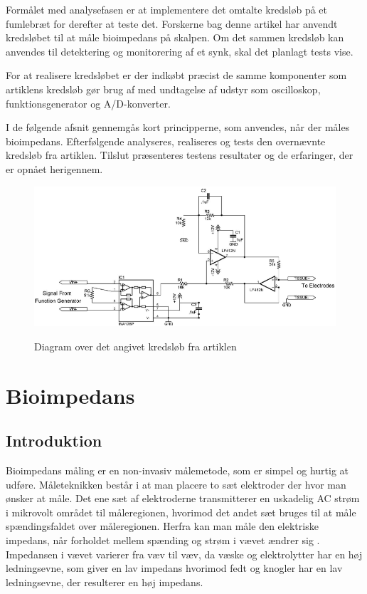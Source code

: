 Formålet med analysefasen er at implementere det omtalte kredsløb på et fumlebræt for derefter at teste det. Forskerne bag denne artikel har anvendt kredsløbet til at måle bioimpedans på skalpen. Om det sammen kredsløb kan anvendes til detektering og monitorering af et synk, skal det planlagt tests vise. 

For at realisere kredsløbet er der indkøbt præcist de samme komponenter  som artiklens kredsløb gør brug af med undtagelse af udstyr som oscilloskop, funktionsgenerator og A/D-konverter.

I de følgende afsnit gennemgås kort principperne, som anvendes, når der måles bioimpedans.  Efterfølgende analyseres, realiseres og tests den overnævnte kredsløb fra artiklen. Tilslut præsenteres testens resultater og de erfaringer, der er opnået herigennem. 



\begin{figure}[H]
\centering
{\includegraphics[width=\linewidth]
{Figure/BIdiagram}}
\caption{Diagram over det angivet kredsløb fra artiklen\cite{Aroom2009}}
\label{fig:BIdiagram}
\end{figure}


\chapter{Bioimpedans}
\section{Introduktion}
Bioimpedans måling  er en non-invasiv målemetode, som er simpel og hurtig at udføre. Måleteknikken består i at man placere to sæt elektroder der hvor man ønsker at måle. Det ene sæt af elektroderne transmitterer  en uskadelig AC strøm i mikrovolt området til måleregionen, hvorimod det andet sæt bruges til at måle spændingsfaldet over måleregionen. Herfra kan man måle den elektriske impedans, når forholdet mellem spænding og strøm i vævet ændrer sig . Impedansen i vævet varierer fra væv til væv, da væske og elektrolytter har en høj ledningsevne, som giver en lav impedans hvorimod fedt og knogler har en lav ledningsevne, der resulterer en høj impedans.\cite{Brantlov2017} 
 
